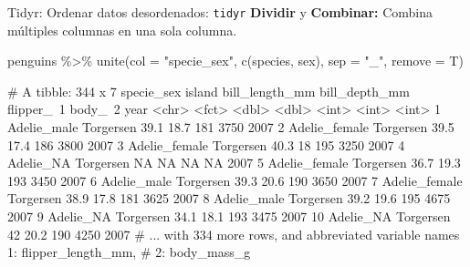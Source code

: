 \documentclass[
  ignorenonframetext,
  aspectratio=169]{beamer}
\newenvironment{Shaded}{\begin{snugshade}}{\end{snugshade}}
\newcommand{\AttributeTok}[1]{\textcolor[rgb]{0.77,0.63,0.00}{#1}}
\newcommand{\FunctionTok}[1]{\textcolor[rgb]{0.00,0.00,0.00}{#1}}
\newcommand{\NormalTok}[1]{#1}
\newcommand{\SpecialCharTok}[1]{\textcolor[rgb]{0.00,0.00,0.00}{#1}}
\newcommand{\StringTok}[1]{\textcolor[rgb]{0.31,0.60,0.02}{#1}}
\let\oldverbatim\verbatim
\let\endoldverbatim\endverbatim
\renewenvironment{verbatim}{\tiny\oldverbatim}{\endoldverbatim}
\begin{document}
\begin{frame}[fragile]{Tidyr: Ordenar datos desordenados:
\texttt{tidyr}}
\protect\hypertarget{tidyr-ordenar-datos-desordenados-tidyr-7}{}
\textbf{Dividir} y \textbf{Combinar:} Combina múltiples columnas en una
sola columna.

\begin{Shaded}
\begin{Highlighting}[]
\NormalTok{penguins }\SpecialCharTok{\%\textgreater{}\%} \FunctionTok{unite}\NormalTok{(}\AttributeTok{col =} \StringTok{"specie\_sex"}\NormalTok{,}
                   \FunctionTok{c}\NormalTok{(species, sex), }\AttributeTok{sep =} \StringTok{"\_"}\NormalTok{, }\AttributeTok{remove =}\NormalTok{ T)}
\end{Highlighting}
\end{Shaded}

\begin{verbatim}
# A tibble: 344 x 7
   specie_sex    island    bill_length_mm bill_depth_mm flipper_~1 body_~2  year
   <chr>         <fct>              <dbl>         <dbl>      <int>   <int> <int>
 1 Adelie_male   Torgersen           39.1          18.7        181    3750  2007
 2 Adelie_female Torgersen           39.5          17.4        186    3800  2007
 3 Adelie_female Torgersen           40.3          18          195    3250  2007
 4 Adelie_NA     Torgersen           NA            NA           NA      NA  2007
 5 Adelie_female Torgersen           36.7          19.3        193    3450  2007
 6 Adelie_male   Torgersen           39.3          20.6        190    3650  2007
 7 Adelie_female Torgersen           38.9          17.8        181    3625  2007
 8 Adelie_male   Torgersen           39.2          19.6        195    4675  2007
 9 Adelie_NA     Torgersen           34.1          18.1        193    3475  2007
10 Adelie_NA     Torgersen           42            20.2        190    4250  2007
# ... with 334 more rows, and abbreviated variable names 1: flipper_length_mm,
#   2: body_mass_g
\end{verbatim}
\end{frame}
\end{document}
